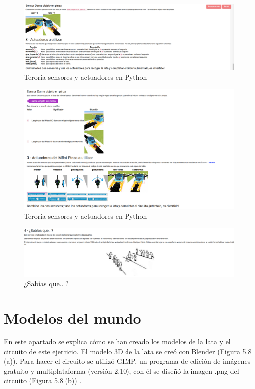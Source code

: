 \begin{figure}[H]
    \centering
    \includegraphics[width=1\textwidth, height=0.4\textwidth]{chapters/images/teoriag4python.png}
    \caption{Teroría sensores y actuadores en Python}
    \label{fig:my_label}
\end{figure}
\begin{figure}[H]
    \centering
    \includegraphics[width=1\textwidth, height=0.4\textwidth]{chapters/images/teoriag4scratch.png}
    \caption{Teroría sensores y actuadores en Python}
    \label{fig:my_label}
\end{figure}
\begin{figure}[H]
    \centering
    \includegraphics[width=1 \textwidth, height=0.27\textwidth]{chapters/images/teoriag5.png}
    \caption{¿Sabías que.. ?}
    \label{fig:my_label}
\end{figure}

\section{Modelos del mundo}
En este apartado se explica cómo se han creado los modelos de la lata y el circuito de este ejercicio.
El modelo 3D de la lata se creó con Blender (Figura 5.8 (a)). Para hacer el circuito  se utilizó  GIMP, un programa de edición de imágenes gratuito y multiplataforma (versión 2.10), con él se diseñó la imagen .png del circuito (Figura 5.8 (b)) .
 
